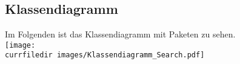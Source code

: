 \begin{samepage}
    \subsection{Klassendiagramm}\label{App_Search_Klassendiagramm}
    Im Folgenden ist das Klassendiagramm mit Paketen zu sehen.\\
    \texttt{[image: \\currfiledir images/Klassendiagramm\_Search.pdf]}

\end{samepage}